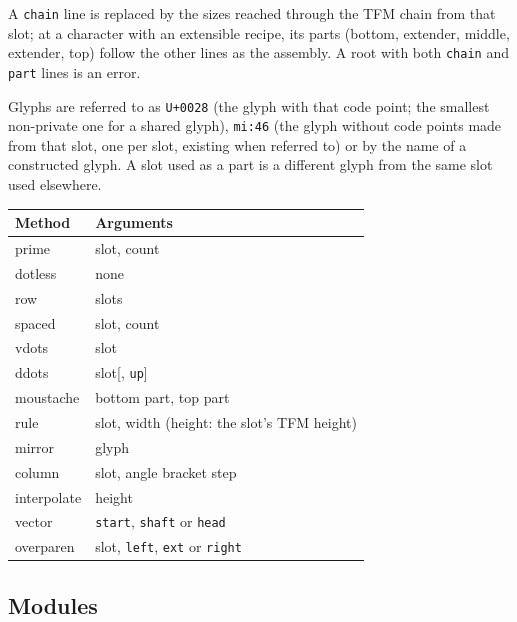 \documentclass[10pt]{article}
\newcommand\code[1]{\texttt{#1}}
\begin{document}
A \code{chain} line is replaced by the sizes reached through the TFM
chain from that slot; at a character with an extensible recipe, its
parts (bottom, extender, middle, extender, top) follow the other lines
as the assembly.  A root with both \code{chain} and \code{part} lines is
an error.

Glyphs are referred to as \code{U+0028} (the glyph with that code point;
the smallest non-private one for a shared glyph), \code{mi:46} (the
glyph without code points made from that slot, one per slot, existing
when referred to) or by the name of a constructed glyph.  A slot used as
a part is a different glyph from the same slot used elsewhere.

\begin{center}
\begin{tabular}{>{\ttfamily}ll}
\toprule
\normalfont Method & Arguments \\
\midrule
prime & slot, count \\
dotless & none \\
row & slots \\
spaced & slot, count \\
vdots & slot \\
ddots & slot[, \code{up}] \\
moustache & bottom part, top part \\
rule & slot, width (height: the slot's TFM height) \\
mirror & glyph \\
column & slot, angle bracket step \\
interpolate & height \\
vector & \code{start}, \code{shaft} or \code{head} \\
overparen & slot, \code{left}, \code{ext} or \code{right} \\
\bottomrule
\end{tabular}
\end{center}

\subsection{Modules}
\end{document}
